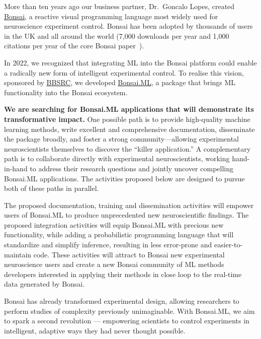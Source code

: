 More than ten years ago our business partner, Dr.~Goncalo Lopes, created
\href{https://bonsai-rx.org/}{Bonsai}, a reactive visual programming
language most widely used for neuroscience experiment control.
%
Bonsai has been adopted by thousands of users in the UK and all around the
world (7,000 downloads per year and 1,000 citations per year of the core Bonsai
paper~\citep{lopesEtAl15}).

In 2022, we recognized that integrating ML into the Bonsai platform could
enable a radically new form of intelligent experimental control.
%
To realise this vision, sponsored by
\href{https://gow.bbsrc.ukri.org/grants/AwardDetails.aspx?FundingReference=BB\%2FW019132\%2F1}{BBSRC},
we developed \href{https://bonsai-rx.org/machinelearning}{Bonsai.ML}, a package
that brings ML functionality into the Bonsai ecosystem.

\textbf{We are searching for Bonsai.ML applications that will demonstrate its
transformative impact.}
%
One possible path is to provide high-quality machine learning methods, write
excellent and comprehensive documentation, disseminate the package broadly, and
foster a strong community—allowing experimental neuroscientists themselves to
discover the “killer application.”
%
A complementary path is to collaborate directly with experimental
neuroscientists, working hand-in-hand to address their research questions and
jointly uncover compelling Bonsai.ML applications.
%
The activities proposed below are designed to pursue both of these paths in
parallel.

The proposed documentation, training and dissemination activities will empower
users of Bonsai.ML to produce unprecedented new neuroscientific findings. The
proposed integration activities will equip Bonsai.ML with precious new
functionality, while adding a probabilistic programming language that will
standardize and simplify inference, resulting in less error-prone and
easier-to-maintain code.
%
These activities will attract to Bonsai new experimental neuroscience users and
create a new Bonsai community of ML methods developers interested in applying
their methods in close loop to the real-time data generated by Bonsai.

Bonsai has already transformed experimental design, allowing researchers to
perform studies of complexity previously unimaginable. With Bonsai.ML, we aim
to spark a second revolution — empowering scientists to control experiments in
intelligent, adaptive ways they had never thought possible.
